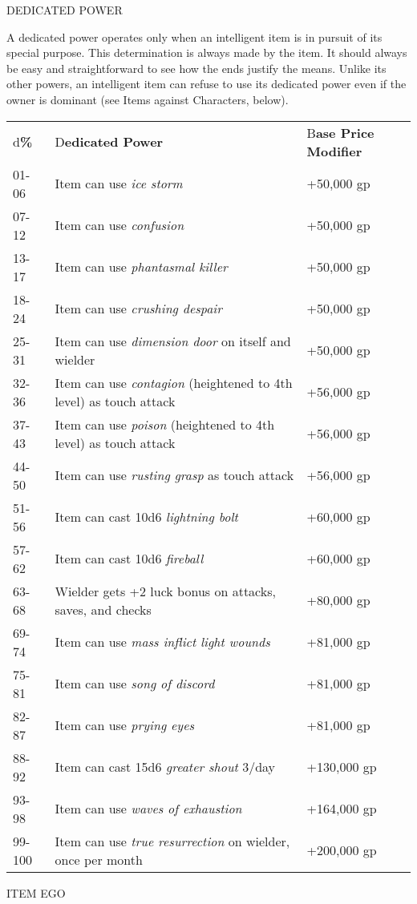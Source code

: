 \documentclass{article}
\begin{document}
\vspace{12pt}
DEDICATED POWER

A dedicated power operates only when an intelligent item is in pursuit of its special 
purpose. This determination is always made by the item. It should always be easy 
and straightforward to see how the ends justify the means. Unlike its other powers, 
an intelligent item can refuse to use its dedicated power even if the owner is 
dominant (see Items against Characters, below).

\vspace{12pt}
\begin{tabular}{|>{\raggedright}p{28pt}|>{\raggedright}p{213pt}|>{\raggedright}p{72pt}|}
\hline
\multicolumn{3}{|p{314pt}|}{S\textbf{pecial Purpose Item Dedicated Powers}}\tabularnewline
\hline
d\textbf{\%} & D\textbf{edicated Power} & B\textbf{ase Price Modifier}\tabularnewline
\hline
01-06 & Item can use \textit{ice storm} & +50,000 gp\tabularnewline
\hline
07-12 & Item can use \textit{confusion} & +50,000 gp\tabularnewline
\hline
13-17 & Item can use \textit{phantasmal killer} & +50,000 gp\tabularnewline
\hline
18-24 & Item can use \textit{crushing despair} & +50,000 gp\tabularnewline
\hline
25-31 & Item can use \textit{dimension door }on itself and wielder & +50,000 gp\tabularnewline
\hline
32-36 & Item can use \textit{contagion }(heightened to 4th level) as touch attack & +56,000 
gp\tabularnewline
\hline
37-43 & Item can use \textit{poison }(heightened to 4th level) as touch attack & +56,000 
gp\tabularnewline
\hline
44-50 & Item can use \textit{rusting grasp }as touch attack & +56,000 gp\tabularnewline
\hline
51-56 & Item can cast 10d6 \textit{lightning bolt} & +60,000 gp\tabularnewline
\hline
57-62 & Item can cast 10d6 \textit{fireball} & +60,000 gp\tabularnewline
\hline
63-68 & Wielder gets +2 luck bonus on attacks, saves, and checks & +80,000 gp\tabularnewline
\hline
69-74 & Item can use \textit{mass inflict light wounds} & +81,000 gp\tabularnewline
\hline
75-81 & Item can use \textit{song of discord} & +81,000 gp\tabularnewline
\hline
82-87 & Item can use \textit{prying eyes} & +81,000 gp\tabularnewline
\hline
88-92 & Item can cast 15d6 \textit{greater shout }3/day & +130,000 gp\tabularnewline
\hline
93-98 & Item can use \textit{waves of exhaustion} & +164,000 gp\tabularnewline
\hline
99-100 & Item can use \textit{true resurrection }on wielder, once per month & +200,000 
gp\tabularnewline
\hline
\end{tabular}

\vspace{12pt}
ITEM EGO
\end{document}
